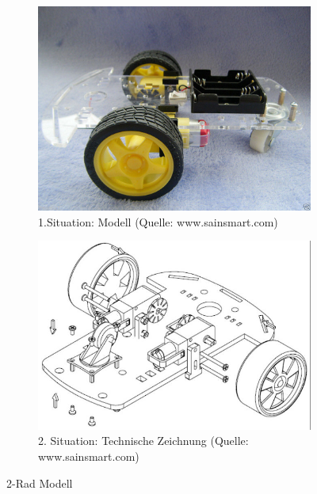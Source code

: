 \begin{figure} [hbp]
	\centering
	\begin{subfigure}[b]{0.4\textwidth}
		\includegraphics[width=\textwidth]{fig/3rad-1.jpg}
		\caption{1.Situation: Modell 
		(Quelle: www.sainsmart.com)}
	\end{subfigure}
	\hfill
	\begin{subfigure}[b]{0.36\textwidth}
		\includegraphics[width=\textwidth]{fig/3rad-3.JPG}
		\caption{2. Situation: Technische Zeichnung
		(Quelle: www.sainsmart.com)}
\end{subfigure}
	\caption{2-Rad Modell}\label{fig:animals}
\end{figure}

